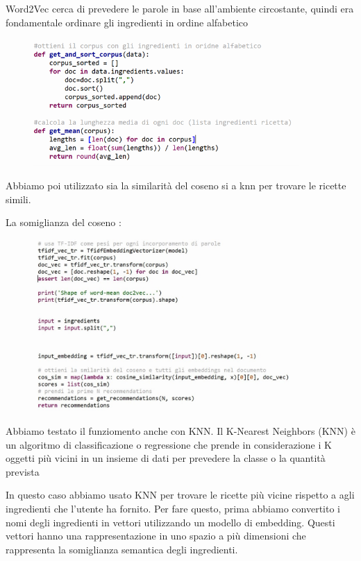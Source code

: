 \documentclass[12pt]{report}
\begin{document}
Word2Vec cerca di prevedere le parole in base all'ambiente circostante, quindi era fondamentale ordinare gli ingredienti in ordine alfabetico

\begin{figure}[H]
        \centering
        {\includegraphics[width=0.9\textwidth]{img/img15.jpg}}
\end{figure}

Abbiamo poi utilizzato sia la similarità del coseno si a knn per trovare le ricette simili.

La somiglianza del coseno : 

\begin{figure}[H]
        \centering
        {\includegraphics[width=0.9\textwidth]{img/img16.jpg}}
\end{figure}
Abbiamo testato il funziomento anche con  KNN.
Il K-Nearest Neighbors (KNN) è un algoritmo di classificazione o regressione che prende in considerazione i K oggetti più vicini in un insieme di dati per prevedere la classe o la quantità prevista

In questo caso abbiamo usato KNN per trovare le ricette più vicine rispetto a agli ingredienti che l'utente ha fornito. Per fare questo, prima abbiamo convertito i nomi degli ingredienti in vettori utilizzando un modello di embedding. Questi vettori hanno una rappresentazione in uno spazio a più dimensioni che rappresenta la somiglianza semantica degli ingredienti.
\end{document}
